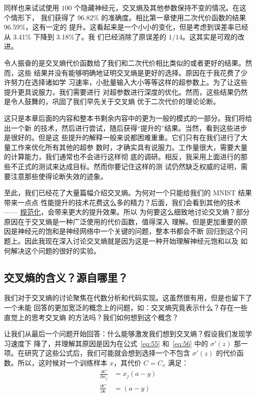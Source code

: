 同样也来试试使用 $100$ 个隐藏神经元，交叉熵及其他参数保持不变的情况。在这个情形下，
我们获得了 96.82\% 的准确度。相比第一章使用二次代价函数的结果 96.59\%，这有一定的
提升。这看起来是一个小小的变化，但是考虑到误差率已经从 3.41\% 下降到 3.18\%了。我
们已经消除了原误差的 $1/14$。这其实是可观的改进。

令人振奋的是交叉熵代价函数给了我们和二次代价相比类似的或者更好的结果。然而，这些
结果并没有能够明确地证明交叉熵是更好的选择。原因在于我花费了少许努力在选择诸如学
习速率，小批量输入大小等等这样的超参数上。为了让这些提升更具说服力，我们需要进行
对超参数进行深度的优化。然而，这些结果仍然是令人鼓舞的，巩固了我们早先关于交叉熵
优于二次代价的理论论断。

这只是本章后面的内容和整本书剩余内容中的更为一般的模式的一部分。我们将给出一个新
的技术，然后进行尝试，随后获得``提升的''结果。当然，看到这些进步是很好的。但是这
些提升的解释一般来说都困难重重。它们只有在我们进行了大量工作来优化所有其他的超参
数时，才确实具有说服力。工作量很大，需要大量的计算能力，我们通常也不会进行这样彻
底的调研。相反，我采用上面进行的那些不正式的测试来达成目标。然而你要记住这样的测
试仍然缺乏权威的证明，需要注意那些使得论断失效的迹象。

至此，我们已经花了大量篇幅介绍交叉熵。为何对一个只能给我们的 MNIST 结果带来一点点
性能提升的技术花费这么多的精力？后面，我们会看到其他的技术 ——
\hyperref[sec:overfitting_and_regularization]{规范化}，会带来更大的提升效果。所以
为何要这么细致地讨论交叉熵？部分原因在于交叉熵是一种广泛使用的代价函数，值得深入
理解。但是更加重要的原因是神经元的饱和是神经网络中一个关键的问题，整本书都会不断
回归到这个问题上。因此我现在深入讨论交叉熵就是因为这是一种开始理解神经元饱和以及
如何解决这个问题的很好的实验。

\subsection{交叉熵的含义？源自哪里？}

我们对于交叉熵的讨论聚焦在代数分析和代码实现。这虽然很有用，但是也留下了一个未能
回答的更加宽泛的概念上的问题，如：交叉熵究竟表示什么？存在一些直觉上的思考交叉熵
的方法吗？我们如何想到这个概念？

让我们从最后一个问题开始回答：什么能够激发我们想到交叉熵？假设我们发现学习速度下
降了，并理解其原因是因为在公式~\eqref{eq:55} 和~\eqref{eq:56} 中的 $\sigma'(z)$
那一项。在研究了这些公式后，我们可能就会想到选择一个不包含 $\sigma'(z)$ 的代价函
数。所以，这时候对一个训练样本 $x$，其代价 $C = C_x$ 满足：
\begin{align} 
  \frac{\partial C}{\partial w_j} &= x_j(a-y) \label{eq:71}\tag{71}\\
  \frac{\partial C}{\partial b } &= (a-y) \label{eq:72}\tag{72}
\end{align}

